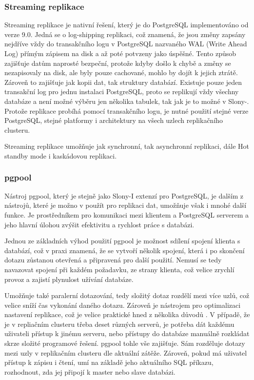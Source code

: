       \subsubsection{Streaming replikace}
      \label{kStreaming}

Streaming replikace je nativní řešení, který je do PostgreSQL implementováno od verze 9.0. Jedná se o log-shipping replikaci, což znamená, že jsou změny zapsány nejdříve vždy do transakčního logu v PostgreSQL nazvaného WAL (Write Ahead Log) přímým zápisem na disk a až poté potvzeny jako úspěšné. Tento způsob zajišťuje datům naprosté bezpeční, protože kdyby došlo k chybě a změny se nezapisovaly na disk, ale byly pouze cachované, mohlo by dojít k jejich ztrátě. Zároveň to zajišťuje jak kopii dat, tak struktury databází. Existuje pouze jeden transakční log pro jednu instalaci PostgreSQL, proto se replikují vždy všechny databáze a není možné výběru jen několika tabulek, tak jak je to možné v Slony-. Protože replikace probíhá pomocí transakčního logu, je nutné použití stejné verze PostgreSQL, stejné platformy i architektury na všech uzlech replikačního clusteru. 

Streaming replikace umožňuje jak synchronní, tak asynchronní replikaci, dále Hot standby mode i kaskádovou replikaci.

      \subsubsection{pgpool}
      \label{kpgpool}
Nástroj pgpool, který je stejně jako Slony-I extenzí pro PostgreSQL, je dalším z nástrojů, které je možno v použít pro replikaci dat, umožňuje však i mnohé další funkce. Je prostředníkem pro komunikaci mezi klientem a PostgreSQL serverem a jeho hlavní úlohou zvýšit efektivitu a rychlost práce s databázi. 

Jednou ze základních výhod použití pgpool je možnost sdílení spojení klienta s databází, což v praxi znamená, že se vytvoří několik spojení, která i po skončení dotazu zůstanou otevřená a připravená pro další použití. Nemusí se tedy navazovat spojení při každém požadavku, ze strany klienta, což velice zrychlí provoz a zajistí plynulost užívání databáze. 

Umožňuje také paralerní dotazování, tedy složitý dotaz rozdělí mezi více uzlů, což velice sníží čas vykonání daného dotazu. Zároveň je nástrojem pro optimalizaci nastavení replikace, což je velice praktické hned z několika důvodů \citep{pgpool2014}. V případě, že je v repliačním clusteru třeba deset různých serverů, je potřeba dát každému uživateli přístup k jinému serveru, nebo přístupy do databáze manuálně rozkládat skrze složité programové řešení. pgpool tohle vše zajišťuje. Sám rozděluje dotazy mezi uzly v replikačním clusteru dle aktuální zátěže. Zároveň, pokud má uživatel přístup k zápisu i čtení, umí na základě jeho aktuálního SQL příkazu, rozhodnout, zda jej připojí k master nebo slave databázi.

